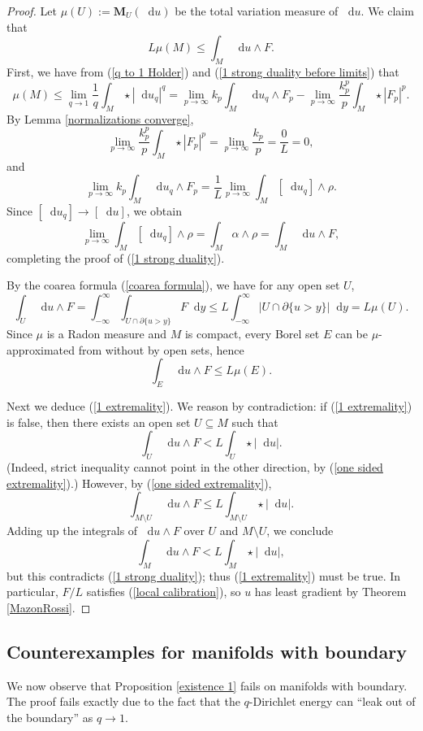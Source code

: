 \documentclass[reqno,11pt]{amsart}
\newcommand*\dif{\mathop{}\!\mathrm{d}}
\newcommand{\Mass}{\mathbf M}
\theoremstyle{definition}
\numberwithin{equation}{section}
\begin{document}
\begin{proof}
Let $\mu(U) := \Mass_U(\dif u)$ be the total variation measure of $\dif u$.
We claim that
\begin{equation}\label{1 strong duality}
	L\mu(M) \leq \int_M \dif u \wedge F.
\end{equation}
First, we have from (\ref{q to 1 Holder}) and (\ref{1 strong duality before limits}) that
$$\mu(M) \leq \lim_{q \to 1} \frac{1}{q} \int_M \star |\dif u_q|^q = \lim_{p \to \infty} k_p \int_M \dif u_q \wedge F_p - \lim_{p \to \infty} \frac{k_p^p}{p} \int_M \star |F_p|^p.$$
By Lemma \ref{normalizations converge},
$$\lim_{p \to \infty} \frac{k_p^p}{p} \int_M \star |F_p|^p = \lim_{p \to \infty} \frac{k_p}{p} = \frac{0}{L} = 0,$$
and
$$\lim_{p \to \infty} k_p \int_M \dif u_q \wedge F_p = \frac{1}{L} \lim_{p \to \infty} \int_M [\dif u_q] \wedge \rho.$$
Since $[\dif u_q] \to [\dif u]$, we obtain
$$\lim_{p \to \infty} \int_M [\dif u_q] \wedge \rho = \int_M \alpha \wedge \rho = \int_M \dif u \wedge F,$$
completing the proof of (\ref{1 strong duality}).

By the coarea formula (\ref{coarea formula}), we have for any open set $U$,
$$\int_U \dif u \wedge F = \int_{-\infty}^\infty \int_{U \cap \partial \{u > y\}} F \dif y \leq L \int_{-\infty}^\infty |U \cap \partial \{u > y\}| \dif y = L \mu(U).$$
Since $\mu$ is a Radon measure and $M$ is compact, every Borel set $E$ can be $\mu$-approximated from without by open sets, hence
\begin{equation}\label{one sided extremality}
\int_E \dif u \wedge F \leq L \mu(E).
\end{equation}

Next we deduce (\ref{1 extremality}).
We reason by contradiction: if (\ref{1 extremality}) is false, then there exists an open set $U \subseteq M$ such that 
$$\int_U \dif u \wedge F < L \int_U \star |\dif u|.$$
(Indeed, strict inequality cannot point in the other direction, by (\ref{one sided extremality}).)
However, by (\ref{one sided extremality}), 
$$\int_{M \setminus U} \dif u \wedge F \leq L \int_{M \setminus U} \star |\dif u|.$$
Adding up the integrals of $\dif u \wedge F$ over $U$ and $M \setminus U$, we conclude 
$$\int_M \dif u \wedge F < L \int_M \star |\dif u|,$$
but this contradicts (\ref{1 strong duality}); thus (\ref{1 extremality}) must be true.
In particular, $F/L$ satisfies (\ref{local calibration}), so $u$ has least gradient by Theorem \ref{MazonRossi}.
\end{proof}

\subsection{Counterexamples for manifolds with boundary}\label{boundaries bad}
We now observe that Proposition \ref{existence 1} fails on manifolds with boundary.
The proof fails exactly due to the fact that the $q$-Dirichlet energy can ``leak out of the boundary'' as $q \to 1$.
\end{document}
